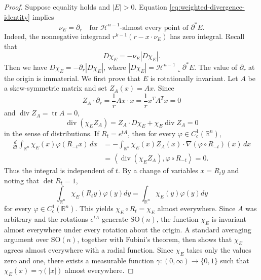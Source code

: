 \documentclass[10pt,a4paper]{amsart}
\numberwithin{equation}{section}
\newcommand{\R}{\mathbb R}
\newcommand{\calH}{\mathcal H}
\newcommand{\diver}{\operatorname{div}}
\begin{document}
\begin{proof}
Suppose equality holds and $|E|>0$.  Equation \eqref{eq:weighted-divergence-identity} implies
\begin{equation*}
    \nu_E=\partial_r
    \quad\text{for }\calH^{n-1}\text{-almost every point of }\partial^*E.
\end{equation*}
Indeed, the nonnegative integrand $r^{k-1}(r-x\cdot\nu_E)$ has zero integral. Recall that
\begin{equation*}
    D\chi_E=-\nu_E|D\chi_E|.
\end{equation*}
Then we have $D\chi_E=-\partial_r|D\chi_E|$, where $|D\chi_E|=\mathcal{H}^{n-1}\mathbin{\llcorner}\partial^*E$.  The value of $\partial_r$ at the origin is immaterial. We first prove that $E$ is rotationally invariant. Let $A$ be a skew-symmetric matrix and set $Z_A(x)=Ax$.  Since 
\begin{equation*}
    Z_A\cdot \partial_r=\frac{1}{r}Ax\cdot x=\frac{1}{r}x^TA^Tx=0
\end{equation*}
and $\diver Z_A=\operatorname{tr}A=0$,
\begin{equation*}
    \diver(\chi_E Z_A)
    =Z_A\cdot D\chi_E+\chi_E\diver Z_A=0
\end{equation*}
in the sense of distributions. If $R_t=e^{tA}$, then for every $\varphi\in C_c^1(\R^n)$,
\begin{align*}
\frac{d}{dt}\int_{\mathbb R^n}
 \chi_E(x)\varphi(R_{-t}x)\,dx
&=-\int_{\mathbb R^n}
 \chi_E(x)Z_A(x)\cdot
 \nabla(\varphi\circ R_{-t})(x)\,dx\\
&=\left\langle
 \diver(\chi_EZ_A),\varphi\circ R_{-t}
 \right\rangle=0.
\end{align*}
Thus the integral is independent of $t$. By a change of variables $x=R_ty$ and noting that $\det R_t=1$, 
\begin{equation*}
    \int_{\R^n}\chi_E(R_ty)\varphi(y)dy=\int_{\R^n}\chi_E(y)\varphi(y)dy
\end{equation*}
for every $\varphi\in C_c^1(\R^n)$. This yields $\chi_E\circ R_t=\chi_E$ almost everywhere. Since $A$ was arbitrary and the rotations $e^{tA}$ generate $\mathrm{SO}(n)$, the function $\chi_E$ is invariant almost everywhere under every rotation about the origin. A standard averaging argument
over $\mathrm{SO}(n)$, together with Fubini's theorem, then shows that $\chi_E$ agrees almost everywhere with a radial function. Since $\chi_E$ takes only the values zero and one, there exists a measurable function $\gamma:(0,\infty)\to\{0,1\}$ such that $\chi_E(x)=\gamma(|x|)$ almost everywhere.


\end{proof}
\end{document}

